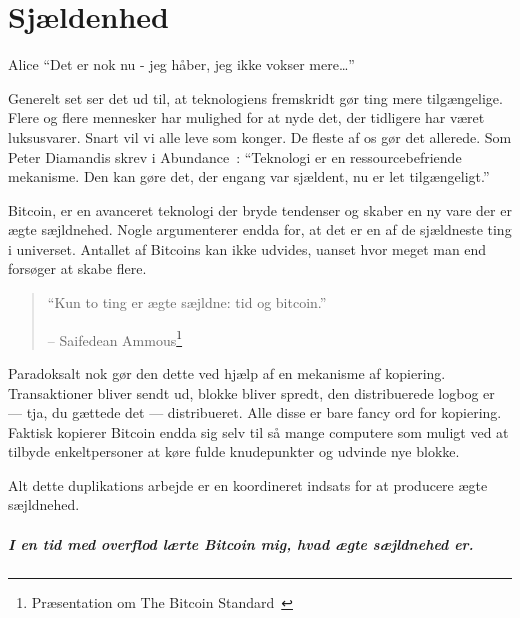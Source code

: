 \chapter{Sjældenhed}
\label{les:2}

\begin{chapquote}{Alice}
\enquote{Det er nok nu - jeg håber, jeg ikke vokser mere\ldots}
\end{chapquote}

Generelt set ser det ud til, at teknologiens fremskridt gør ting mere 
tilgængelige. Flere og flere mennesker har mulighed for at nyde det, der 
tidligere har været luksusvarer. Snart vil vi alle leve som konger. De fleste 
af os gør det allerede. Som Peter Diamandis skrev i Abundance~\cite{abundance}: 
\enquote{Teknologi er en ressourcebefriende mekanisme. Den kan gøre det, der 
engang var sjældent, nu er let tilgængeligt.}

Bitcoin, er en avanceret teknologi der bryde tendenser og skaber en ny vare 
der er ægte sæjldnehed. Nogle argumenterer endda for, at det er en af 
de sjældneste ting i universet. Antallet af Bitcoins kan ikke udvides, 
uanset hvor meget man end forsøger at skabe flere.

\begin{quotation}\begin{samepage}
\enquote{Kun to ting er ægte sæjldne: tid og bitcoin.}
\begin{flushright} -- Saifedean Ammous\footnote{Præsentation om The Bitcoin 
    Standard~\cite{bitcoinstandard-pres}}
\end{flushright}\end{samepage}\end{quotation}

Paradoksalt nok gør den dette ved hjælp af en mekanisme af kopiering. 
Transaktioner bliver sendt ud, blokke bliver spredt, den distribuerede logbog 
er --- tja, du gættede det --- distribueret. Alle disse er bare fancy ord for 
kopiering. Faktisk kopierer Bitcoin endda sig selv til så mange computere som 
muligt ved at tilbyde enkeltpersoner at køre fulde knudepunkter og udvinde 
nye blokke.

Alt dette duplikations arbejde er en koordineret indsats for at producere 
ægte sæjldnehed.

\paragraph{I en tid med overflod lærte Bitcoin mig, hvad ægte sæjldnehed er.}

